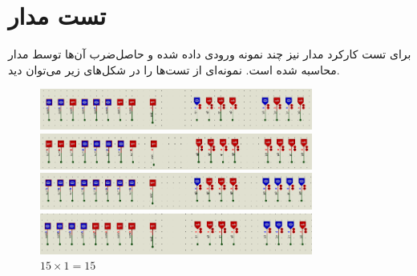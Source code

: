 \documentclass[12pt,onecolumn,a4paper,fleqn]{article}
\begin{document}
	\section{تست مدار}
	برای تست کارکرد مدار نیز چند نمونه ورودی داده شده و حاصل‌ضرب آن‌ها توسط مدار محاسبه شده است. نمونه‌ای از تست‌ها را در شکل‌های زیر می‌توان دید.
	\begin{figure}[H]
		\centering
		\includegraphics[width=0.8\textwidth]{source/test1.png}
		\caption{$7 \times 5 = 35$}
		\vspace*{5mm}
		\includegraphics[width=0.8\textwidth]{source/test2.png}
		\caption{$15 \times 15 = 225$}
		\vspace*{5mm}
		\includegraphics[width=0.8\textwidth]{source/test3.png}
		\caption{$7\times 0 = 0$}
		\vspace*{5mm}
		\includegraphics[width=0.8\textwidth]{source/test4.png}
		\caption{$15 \times 1 = 15$}
	\end{figure}
\end{document}
